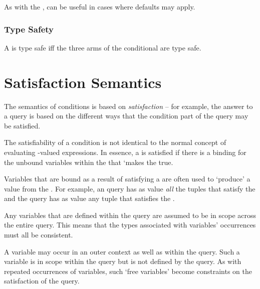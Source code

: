 \begin{aside}
As with the ,  can be useful in cases where defaults may apply.
\end{aside}

\subsubsection{Type Safety}
A  is type safe iff the three arms of the conditional are type safe.
\begin{prooftree}
\end{prooftree}

\section{Satisfaction Semantics}
\label{querySemantics}

The semantics of conditions is based on \emph{satisfaction} -- for example, the answer to a query is based on the different ways that the condition part of the query may be satisfied. 

The satisfiability of a condition is not identical to the normal concept of evaluating -valued expressions. In essence, a  is satisfied if there is a binding for the unbound variables within the  that `makes the  true.

Variables that are bound as a result of satisfying a  are often used to `produce' a value from the . For example, an  query has as value \emph{all} the tuples that satisfy the  and the  query has as value any tuple that satisfies the .

\begin{aside}
Any variables that are defined within the query are assumed to be in scope across the entire query. This means that the types associated with variables' occurrences must all be consistent.

A variable may occur in an outer context as well as within the query. Such a variable is in scope within the query but is not defined by the query. As with repeated occurrences of variables, such `free variables' become constraints on the satisfaction of the query.
\end{aside}

